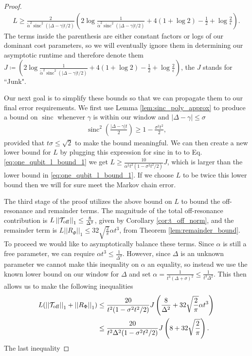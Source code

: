 \documentclass{article}
\newcommand{\off}{\rm off}
\newcommand{\norm}[1]{\left| \left| #1 \right| \right|}
\DeclareMathOperator{\sinc}{sinc}
\begin{document}
\begin{proof}
 \begin{align}
     L \ge \frac{2}{\widetilde{\alpha}^2 \sinc^2(|\Delta - \gamma|t/2)} \left( 2 \log \frac{1}{\widetilde{\alpha}^2 \sinc^2(|\Delta - \gamma|t/2)} + 4( 1 + \log 2) - \frac{1}{2} + \log \frac{2}{\epsilon} \right). \label{eq:one_qubit_l_bound_1}
 \end{align}
 The terms inside the parenthesis are either constant factors or logs of our dominant cost parameters, so we will eventually ignore them in determining our asymptotic runtime and therefore denote them $J \coloneqq \left( 2 \log \frac{1}{\widetilde{\alpha}^2 \sinc^2(|\Delta - \gamma|t/2)} + 4( 1 + \log 2) - \frac{1}{2} + \log \frac{2}{\epsilon} \right)$, the $J$ stands for ``Junk".

 Our next goal is to simplify these bounds so that we can propagate them to our final error requirements. We first use Lemma \ref{lem:sinc_poly_approx} to produce a  bound on $\sinc$ whenever $\gamma$ is within our window and $|\Delta - \gamma| \le \sigma$
 \begin{align}
     \sinc^2\left( \frac{|\Delta - \gamma| t}{2} \right) \ge 1 - \frac{\sigma^2 t^2}{2},
 \end{align}
 provided that $t \sigma \le \sqrt{2}$ to make the bound meaningful. We can then create a new lower bound for $L$ by plugging this expression for sinc in to to Eq. \eqref{eq:one_qubit_l_bound_1} we get $L \ge \frac{10}{\alpha^2 t^2(1 - \sigma^2 t^2 / 2)} J$, which is larger than the lower bound in \eqref{eq:one_qubit_l_bound_1}. If we choose $L$ to be twice this lower bound then we will for sure meet the Markov chain error. 
 
 The third stage of the proof utilizes the above bound on $L$ to bound the  off-resonance and remainder terms. The magnitude of the total off-resonance contribution is $L \norm{\mathcal{T}_{\off}}_1 \le \frac{8 }{\Delta^2}$, given by Corollary \ref{cor:t_off_norm}, and the remainder term is $L \norm{R_{\Phi}}_1 \le 32 \sqrt{\frac{2}{\pi}} \alpha t^3$, from Theorem \ref{lem:remainder_bound}. To proceed we would like to asymptotically balance these terms. Since $\alpha$ is still a free parameter, we can require $\alpha t^3 \le \frac{1}{\Delta^2}$. However, since $\Delta$ is an unknown parameter we cannot make this inequality on $\alpha$ an equality, so instead we use the known lower bound on our window for $\Delta$ and set $\alpha = \frac{1}{t^3(\Delta + \sigma)^2} \le \frac{1}{t^3 \Delta^2}$. This then allows us to make the following inequalities
 \begin{align}
     L(\norm{\mathcal{T}_{\off}}_1 + \norm{R_{\Phi}}_1) &\le \frac{20}{t^2(1 - \sigma^2 t^2 / 2)}J \left( \frac{8}{\Delta^2} + 32 \sqrt{\frac{2}{\pi}} \alpha t^3 \right) \\
    &\le \frac{20}{t^2 \Delta^2 (1 - \sigma^2 t^2 / 2)}J \left( 8 + 32 \sqrt{\frac{2}{\pi}}\right).
 \end{align}
 The last inequality
 

\end{proof}
\end{document}
